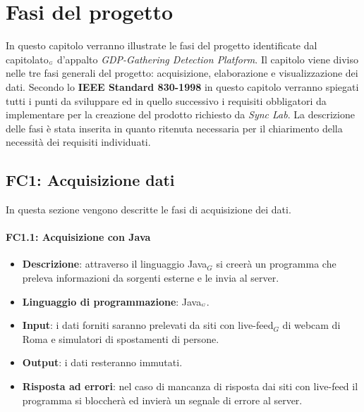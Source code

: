 \chapter{Fasi del progetto}\label{fasiProgetto}
In questo capitolo verranno illustrate le fasi del progetto identificate dal capitolato$_{\scaleto{G}{3pt}}$ d'appalto \textit{GDP-Gathering Detection Platform}. Il capitolo viene diviso nelle tre fasi generali del progetto: acquisizione, elaborazione e visualizzazione dei dati. Secondo lo \textbf{IEEE Standard 830-1998} in questo capitolo verranno spiegati tutti i punti da sviluppare ed in quello successivo i requisiti obbligatori da implementare per la creazione del prodotto richiesto da \textit{Sync Lab}. La descrizione delle fasi è stata inserita in quanto ritenuta necessaria per il chiarimento della necessità dei requisiti individuati. %

\section{FC1: Acquisizione dati}\label{fasiProgettoAquisizioneDati}%
In questa sezione vengono descritte le fasi di acquisizione dei dati.

\subsubsection{FC1.1: Acquisizione con Java}\label{fasiProgettoAquisizioneDatiJava}

\begin{itemize}
	\item \textbf{Descrizione}: attraverso il linguaggio Java$_G$ si creerà un programma che preleva informazioni da sorgenti esterne e le invia al server.
	\item \textbf{Linguaggio di programmazione}: Java$_{\scaleto{G}{3pt}}$.
	\item \textbf{Input}: i dati forniti saranno prelevati da siti con live-feed$_G$ di webcam di Roma e simulatori di spostamenti di persone.
	\item \textbf{Output}: i dati resteranno immutati.
	\item \textbf{Risposta ad errori}: nel caso di mancanza di risposta dai siti con live-feed il programma si bloccherà ed invierà un segnale di errore al server.
\end{itemize}


